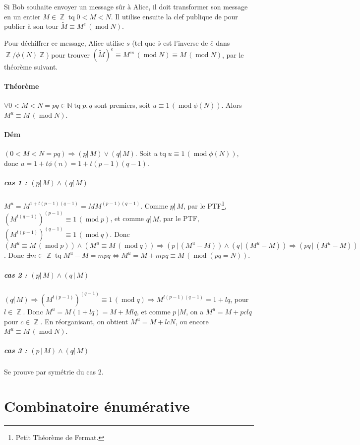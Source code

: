 \documentclass{article}
\DeclareMathOperator{\tq}{\text{ tq }}
\DeclareMathOperator{\Z}{\mathbb Z}
\DeclareMathOperator{\modulo}{mod}
\newcommand{\cmod}[1]{\, (\modulo #1)}
\begin{document}
			Si Bob souhaite envoyer un message sûr à Alice, il doit transformer son message en un entier $M \in \Z \tq 0 < M < N$. Il utilise ensuite la clef publique de
			pour publier à son tour $\widetilde M \equiv M^e \cmod N$.
			
			Pour déchiffrer ce message, Alice utilise $s$ (tel que $\overline s$ est l'inverse de $\overline e$ dans $\Z/\phi(N)\Z$) pour trouver
			$(\widetilde M)^e \equiv M^{es} \cmod N \equiv M \cmod N$, par le théorème suivant.
			
			\paragraph{Théorème} $\forall 0 < M < N = pq \in \mathbb N \tq p, q$ sont premiers, soit $u \equiv 1 \cmod{\phi(N)}$. Alors $M^u \equiv M \cmod N$.
			
			\paragraph{Dém} $(0 < M < N = pq) \Rightarrow (p \not | \, M) \lor (q \not | \, M)$. Soit $u \tq u \equiv 1 \cmod{\phi(N)}$, donc
			$u = 1 + t\phi(n) = 1 + t(p-1)(q-1)$.
			
				\subparagraph{cas 1 : $(p \not | \, M) \land (q \not | \, M)$} $M^u = M^{1 + t(p-1)(q-1)} = MM^{(p-1)(q-1)}$.
				Comme $p \not | \, M$, par le PTF\footnote{Petit Théorème de Fermat.}, $(M^{t(q-1)})^{(p-1)} \equiv 1 \cmod p$, et comme $q \not | \, M$, par le PTF,
				$(M^{t(p-1)})^{(q-1)} \equiv 1 \cmod q$.
				Donc $(M^u \equiv M \cmod p) \land (M^u \equiv M \cmod q) \Rightarrow (p \, | \, (M^u - M)) \land (q \, | \, (M^u - M)) \Rightarrow (pq \, | \, (M^u - M))$.
				Donc $\exists m \in \Z \tq M^u - M = mpq \iff M^u = M + mpq \equiv M \cmod{(pq=N)}$.
				
				\subparagraph{cas 2 : $(p \not | \, M) \land (q \, | \, M)$} $(q \not | \, M) \Rightarrow (M^{t(p-1)})^{(q-1)} \equiv 1 \cmod q \Rightarrow
				M^{t(p-1)(q-1)} = 1 + lq$, pour $l \in \Z$. Donc $M^u = M(1 + lq) = M + Mlq$, et comme $p \, | M$, on a $M^u = M + pclq$ pour $c \in \Z$. En réorganisant,
				on obtient $M^u = M + lcN$, ou encore $M^u \equiv M \cmod N$.
								
				\subparagraph{cas 3 : $(p \, | \, M) \land (q \not | \, M)$} Se prouve par symétrie du cas 2.
	
	\section{Combinatoire énumérative}
	
\end{document}
